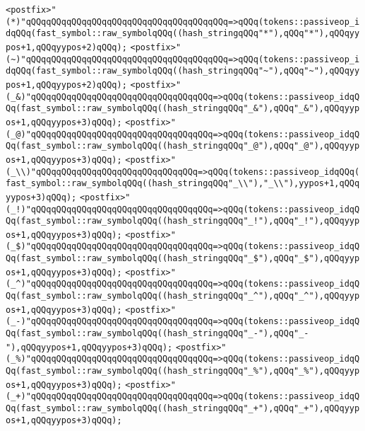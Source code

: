\verb|<postfix>"(*)"qQQqqQQqqQQqqQQqqQQqqQQqqQQqqQQqqQQqqQQq=>qQQq(tokens::passiveop_idqQQq(fast_symbol::raw_symbolqQQq((hash_stringqQQq"*"),qQQq"*"),qQQqyypos+1,qQQqyypos+2)qQQq);|\newline
\verb|<postfix>"(~)"qQQqqQQqqQQqqQQqqQQqqQQqqQQqqQQqqQQqqQQq=>qQQq(tokens::passiveop_idqQQq(fast_symbol::raw_symbolqQQq((hash_stringqQQq"~"),qQQq"~"),qQQqyypos+1,qQQqyypos+2)qQQq);|\newline
\verb|<postfix>"(_&)"qQQqqQQqqQQqqQQqqQQqqQQqqQQqqQQqqQQq=>qQQq(tokens::passiveop_idqQQq(fast_symbol::raw_symbolqQQq((hash_stringqQQq"_&"),qQQq"_&"),qQQqyypos+1,qQQqyypos+3)qQQq);|\newline
\verb|<postfix>"(_@)"qQQqqQQqqQQqqQQqqQQqqQQqqQQqqQQqqQQq=>qQQq(tokens::passiveop_idqQQq(fast_symbol::raw_symbolqQQq((hash_stringqQQq"_@"),qQQq"_@"),qQQqyypos+1,qQQqyypos+3)qQQq);|\newline
\verb|<postfix>"(_\\)"qQQqqQQqqQQqqQQqqQQqqQQqqQQqqQQq=>qQQq(tokens::passiveop_idqQQq(fast_symbol::raw_symbolqQQq((hash_stringqQQq"_\\"),"_\\"),yypos+1,qQQqyypos+3)qQQq);|\newline
\verb|<postfix>"(_!)"qQQqqQQqqQQqqQQqqQQqqQQqqQQqqQQqqQQq=>qQQq(tokens::passiveop_idqQQq(fast_symbol::raw_symbolqQQq((hash_stringqQQq"_!"),qQQq"_!"),qQQqyypos+1,qQQqyypos+3)qQQq);|\newline
\verb|<postfix>"(_$)"qQQqqQQqqQQqqQQqqQQqqQQqqQQqqQQqqQQq=>qQQq(tokens::passiveop_idqQQq(fast_symbol::raw_symbolqQQq((hash_stringqQQq"_$"),qQQq"_$"),qQQqyypos+1,qQQqyypos+3)qQQq);|\newline
\verb|<postfix>"(_^)"qQQqqQQqqQQqqQQqqQQqqQQqqQQqqQQqqQQq=>qQQq(tokens::passiveop_idqQQq(fast_symbol::raw_symbolqQQq((hash_stringqQQq"_^"),qQQq"_^"),qQQqyypos+1,qQQqyypos+3)qQQq);|\newline
\verb|<postfix>"(_-)"qQQqqQQqqQQqqQQqqQQqqQQqqQQqqQQqqQQq=>qQQq(tokens::passiveop_idqQQq(fast_symbol::raw_symbolqQQq((hash_stringqQQq"_-"),qQQq"_-"),qQQqyypos+1,qQQqyypos+3)qQQq);|\newline
\verb|<postfix>"(_%)"qQQqqQQqqQQqqQQqqQQqqQQqqQQqqQQqqQQq=>qQQq(tokens::passiveop_idqQQq(fast_symbol::raw_symbolqQQq((hash_stringqQQq"_%"),qQQq"_%"),qQQqyypos+1,qQQqyypos+3)qQQq);|\newline
\verb|<postfix>"(_+)"qQQqqQQqqQQqqQQqqQQqqQQqqQQqqQQqqQQq=>qQQq(tokens::passiveop_idqQQq(fast_symbol::raw_symbolqQQq((hash_stringqQQq"_+"),qQQq"_+"),qQQqyypos+1,qQQqyypos+3)qQQq);|\newline
